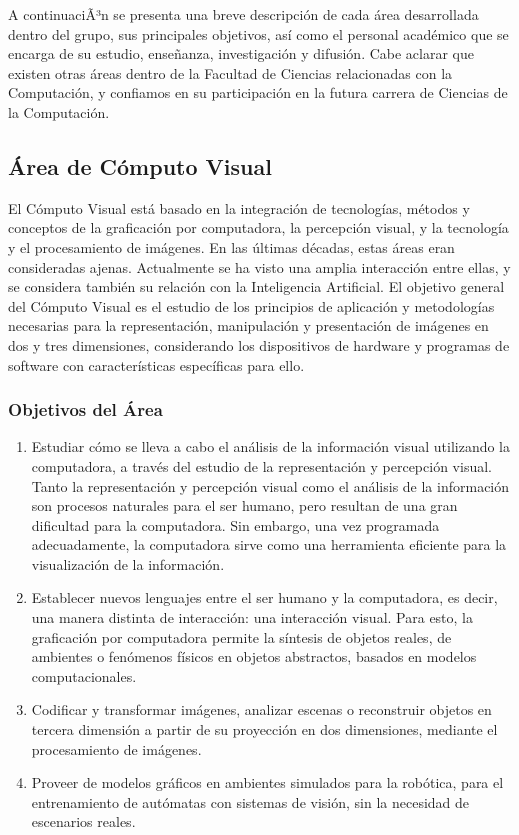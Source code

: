 A continuaciÃ³n se presenta una breve descripci\'on de cada \'area desarrollada dentro del grupo, sus principales objetivos, as\'i como el personal acad\'emico que se encarga de su estudio, ense\~nanza, investigaci\'on y difusi\'on. Cabe aclarar que existen otras \'areas dentro de la Facultad de Ciencias relacionadas con la Computaci\'on, y confiamos en su participaci\'on en la futura carrera de Ciencias de la Computaci\'on.


\subsection{\'Area de C\'omputo Visual}

El C\'omputo Visual est\'a basado en la integraci\'on de tecnolog\'ias, m\'etodos y conceptos de la graficaci\'on por computadora, la percepci\'on visual, y la tecnolog\'ia y el procesamiento de im\'agenes. En las \'ultimas d\'ecadas, estas \'areas eran consideradas ajenas. Actualmente se ha visto una amplia interacci\'on entre ellas, y se considera tambi\'en su relaci\'on con la Inteligencia Artificial. El objetivo general del C\'omputo Visual es el estudio de los principios de aplicaci\'on y metodolog\'ias necesarias para la representaci\'on, manipulaci\'on y presentaci\'on de im\'agenes en dos y tres dimensiones, considerando los dispositivos de hardware y programas de software con caracter\'isticas
espec\'ificas para ello.

\subsubsection{Objetivos del \'Area}

\begin{enumerate}
\item Estudiar c\'omo se lleva a cabo el an\'alisis de la informaci\'on visual utilizando la computadora, a trav\'es del estudio de la representaci\'on y percepci\'on visual. Tanto la representaci\'on y percepci\'on visual como el an\'alisis de la informaci\'on son procesos naturales para el ser humano, pero resultan de una gran dificultad para la computadora. Sin embargo, una vez programada adecuadamente, la computadora sirve como una herramienta eficiente para la visualizaci\'on de la informaci\'on.

\item Establecer nuevos lenguajes entre el ser humano y la computadora, es decir, una manera distinta de interacci\'on: una interacci\'on visual. Para esto, la graficaci\'on por computadora permite la s\'intesis de objetos reales, de ambientes o fen\'omenos f\'isicos en objetos abstractos, basados en modelos computacionales.

\item Codificar y transformar im\'agenes, analizar escenas o reconstruir objetos en tercera dimensi\'on a partir de su proyecci\'on en dos dimensiones, mediante el procesamiento de im\'agenes.

\item Proveer de modelos gr\'aficos en ambientes simulados para la rob\'otica, para el entrenamiento de aut\'omatas con sistemas de visi\'on, sin la necesidad de escenarios reales.
\end{enumerate}

